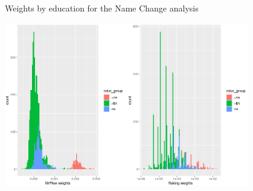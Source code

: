
\begin{frame}{Weights by education for the Name Change analysis}

    \includegraphics[width=0.8\textwidth]{static_figures/w_educ_hist.png}
\end{frame}





